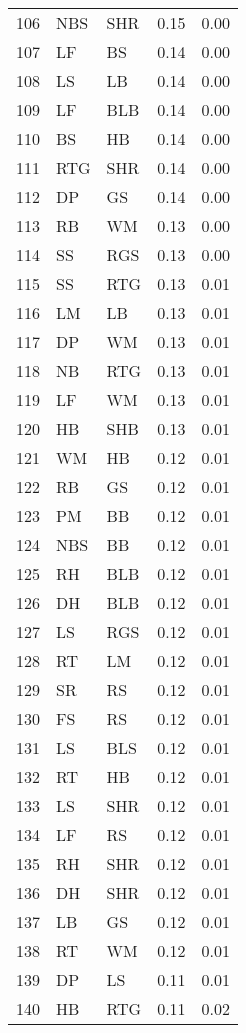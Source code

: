 \begin{table}[ht]
\begin{tabular}{rllrr}
  106 & NBS & SHR & 0.15 & 0.00 \\ 
  107 & LF & BS & 0.14 & 0.00 \\ 
  108 & LS & LB & 0.14 & 0.00 \\ 
  109 & LF & BLB & 0.14 & 0.00 \\ 
  110 & BS & HB & 0.14 & 0.00 \\ 
  111 & RTG & SHR & 0.14 & 0.00 \\ 
  112 & DP & GS & 0.14 & 0.00 \\ 
  113 & RB & WM & 0.13 & 0.00 \\ 
  114 & SS & RGS & 0.13 & 0.00 \\ 
  115 & SS & RTG & 0.13 & 0.01 \\ 
  116 & LM & LB & 0.13 & 0.01 \\ 
  117 & DP & WM & 0.13 & 0.01 \\ 
  118 & NB & RTG & 0.13 & 0.01 \\ 
  119 & LF & WM & 0.13 & 0.01 \\ 
  120 & HB & SHB & 0.13 & 0.01 \\ 
  121 & WM & HB & 0.12 & 0.01 \\ 
  122 & RB & GS & 0.12 & 0.01 \\ 
  123 & PM & BB & 0.12 & 0.01 \\ 
  124 & NBS & BB & 0.12 & 0.01 \\ 
  125 & RH & BLB & 0.12 & 0.01 \\ 
  126 & DH & BLB & 0.12 & 0.01 \\ 
  127 & LS & RGS & 0.12 & 0.01 \\ 
  128 & RT & LM & 0.12 & 0.01 \\ 
  129 & SR & RS & 0.12 & 0.01 \\ 
  130 & FS & RS & 0.12 & 0.01 \\ 
  131 & LS & BLS & 0.12 & 0.01 \\ 
  132 & RT & HB & 0.12 & 0.01 \\ 
  133 & LS & SHR & 0.12 & 0.01 \\ 
  134 & LF & RS & 0.12 & 0.01 \\ 
  135 & RH & SHR & 0.12 & 0.01 \\ 
  136 & DH & SHR & 0.12 & 0.01 \\ 
  137 & LB & GS & 0.12 & 0.01 \\ 
  138 & RT & WM & 0.12 & 0.01 \\ 
  139 & DP & LS & 0.11 & 0.01 \\ 
  140 & HB & RTG & 0.11 & 0.02 \\ 

\end{tabular}
\end{table}
